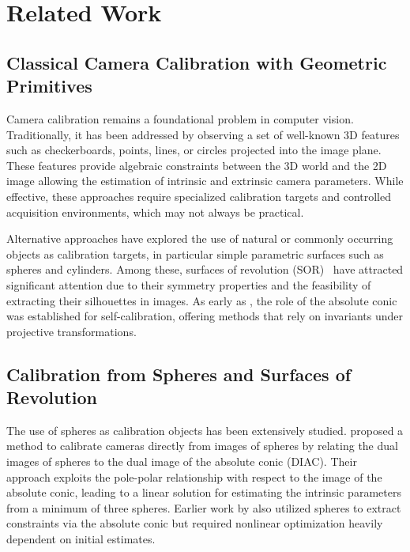 \section{Related Work}
\label{sec:related}

\subsection{Classical Camera Calibration with Geometric Primitives}

Camera calibration remains a foundational problem in computer vision. Traditionally, it has been addressed by observing a set of well-known 3D features such as checkerboards, points, lines, or circles projected into the image plane. These features provide algebraic constraints between the 3D world and the 2D image allowing the estimation of intrinsic and extrinsic camera parameters. While effective, these approaches require specialized calibration targets and controlled acquisition environments, which may not always be practical.

Alternative approaches have explored the use of natural or commonly occurring objects as calibration targets, in particular simple parametric surfaces such as spheres and cylinders. Among these, surfaces of revolution (SOR)~\cite{liu2019realtime} have attracted significant attention due to their symmetry properties and the feasibility of extracting their silhouettes in images. As early as \cite{Maybank1992}, the role of the absolute conic was established for self-calibration, offering methods that rely on invariants under projective transformations.

\subsection{Calibration from Spheres and Surfaces of Revolution}

The use of spheres as calibration objects has been extensively studied. \cite{Zhang2007} proposed a method to calibrate cameras directly from images of spheres by relating the dual images of spheres to the dual image of the absolute conic (DIAC). Their approach exploits the pole-polar relationship with respect to the image of the absolute conic, leading to a linear solution for estimating the intrinsic parameters from a minimum of three spheres. Earlier work by \cite{teramoto2002calibration} also utilized spheres to extract constraints via the absolute conic but required nonlinear optimization heavily dependent on initial estimates.

